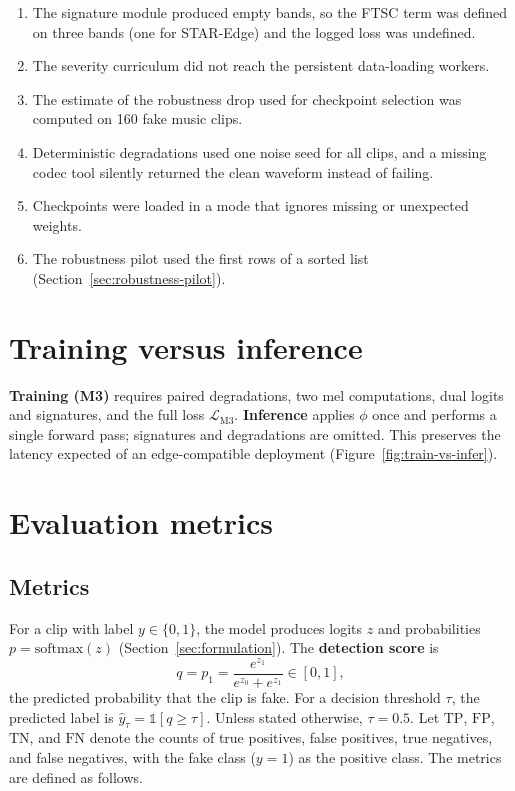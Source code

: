 \begin{enumerate}
  \item The signature module produced empty bands, so the FTSC term was defined on three bands (one for STAR-Edge) and the logged loss was undefined.
  \item The severity curriculum did not reach the persistent data-loading workers.
  \item The estimate of the robustness drop used for checkpoint selection was computed on 160 fake music clips.
  \item Deterministic degradations used one noise seed for all clips, and a missing codec tool silently returned the clean waveform instead of failing.
  \item Checkpoints were loaded in a mode that ignores missing or unexpected weights.
  \item The robustness pilot used the first rows of a sorted list (Section~\ref{sec:robustness-pilot}).
\end{enumerate}

\section{Training versus inference}
\label{sec:train-infer}

\textbf{Training (M3)} requires paired degradations, two mel computations, dual logits and signatures, and the full loss $\mathcal{L}_{\mathrm{M3}}$. \textbf{Inference} applies $\phi$ once and performs a single forward pass; signatures and degradations are omitted. This preserves the latency expected of an edge-compatible deployment (Figure~\ref{fig:train-vs-infer}).



\section{Evaluation metrics}
\label{sec:evaluation-metrics}

\subsection{Metrics}

For a clip with label $y \in \{0,1\}$, the model produces logits $z$ and probabilities $p = \mathrm{softmax}(z)$ (Section~\ref{sec:formulation}). The \textbf{detection score} is
\begin{equation}
q = p_1 = \frac{e^{z_1}}{e^{z_0} + e^{z_1}} \in [0,1],
\label{eq:q}
\end{equation}
the predicted probability that the clip is fake. For a decision threshold $\tau$, the predicted label is $\hat{y}_\tau = \mathbb{1}[q \ge \tau]$. Unless stated otherwise, $\tau = 0.5$. Let $\mathrm{TP}$, $\mathrm{FP}$, $\mathrm{TN}$, and $\mathrm{FN}$ denote the counts of true positives, false positives, true negatives, and false negatives, with the fake class ($y=1$) as the positive class. The metrics are defined as follows.

